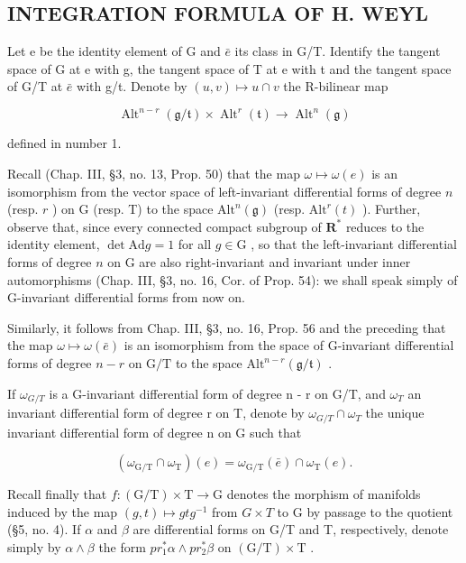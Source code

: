 \subsection{INTEGRATION FORMULA OF H. WEYL}

Let e be the identity element of G and \(\bar{e}\) its class in G/T. Identify the tangent space of G at e with g, the tangent space of T at e with t and the tangent space of G/T at \(\bar{e}\) with g/t. Denote by \((u,v)\mapsto u\cap v\) the R-bilinear map

\[
\operatorname{Alt} ^ {n - r} (\mathfrak {g} / \mathfrak {t}) \times \operatorname{Alt} ^ {r} (\mathfrak {t}) \rightarrow \operatorname{Alt} ^ {n} (\mathfrak {g})
\]

defined in number 1.

Recall (Chap. III, §3, no. 13, Prop. 50) that the map \(\omega \mapsto \omega(e)\) is an isomorphism from the vector space of left-invariant differential forms of degree \(n\) (resp. \(r\) ) on G (resp. T) to the space \(\mathrm{Alt}^n(\mathfrak{g})\) (resp. \(\mathrm{Alt}^r(t)\) ). Further, observe that, since every connected compact subgroup of \(\mathbf{R}^*\) reduces to the identity element, \(\det \mathrm{Ad}g = 1\) for all \(g \in \mathrm{G}\) , so that the left-invariant differential forms of degree \(n\) on G are also right-invariant and invariant under inner automorphisms (Chap. III, §3, no. 16, Cor. of Prop. 54): we shall speak simply of G-invariant differential forms from now on.

Similarly, it follows from Chap. III, §3, no. 16, Prop. 56 and the preceding that the map \(\omega \mapsto \omega (\bar{e})\) is an isomorphism from the space of G-invariant differential forms of degree \(n - r\) on \(\mathrm{G / T}\) to the space \(\mathrm{Alt}^{n - r}(\mathfrak{g} / \mathfrak{t})\) .

If \(\omega_{G/T}\) is a G-invariant differential form of degree n - r on G/T, and \(\omega_{T}\) an invariant differential form of degree r on T, denote by \(\omega_{G/T} \cap \omega_{T}\) the unique invariant differential form of degree n on G such that

\[
(\omega_ {\mathrm{G/T}} \cap \omega_ {\mathrm{T}}) (e) = \omega_ {\mathrm{G/T}} (\bar {e}) \cap \omega_ {\mathrm{T}} (e).
\]

Recall finally that \(f : (\mathrm{G}/\mathrm{T}) \times \mathrm{T} \to \mathrm{G}\) denotes the morphism of manifolds induced by the map \((g, t) \mapsto gtg^{-1}\) from \(G \times T\) to G by passage to the quotient (§5, no. 4). If \(\alpha\) and \(\beta\) are differential forms on G/T and T, respectively, denote simply by \(\alpha \wedge \beta\) the form \(pr_{1}^{*}\alpha \wedge pr_{2}^{*}\beta\) on \((\mathrm{G}/\mathrm{T}) \times \mathrm{T}\) .


